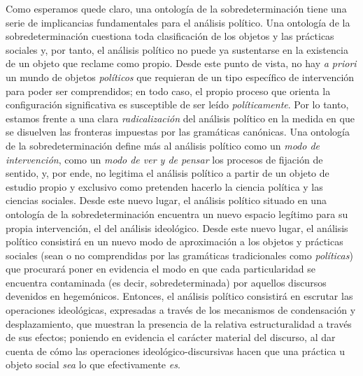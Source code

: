 Como esperamos quede claro, una ontología de la sobredeterminación tiene una serie de implicancias fundamentales para el análisis político. Una ontología de la sobredeterminación cuestiona toda clasificación de los objetos y las prácticas sociales y, por tanto, el análisis político no puede ya sustentarse en la existencia de un objeto que reclame como propio. Desde este punto de vista, no hay \emph{a priori} un mundo de objetos \emph{políticos} que requieran de un tipo específico de intervención para poder ser comprendidos; en todo caso, el propio proceso que orienta la configuración significativa es susceptible de ser leído \emph{políticamente}. Por lo tanto, estamos frente a una clara \emph{radicalización} del análisis político en la medida en que se disuelven las fronteras impuestas por las gramáticas canónicas. Una ontología de la sobredeterminación define más al análisis político como un \emph{modo de intervención}, como un \emph{modo de ver y de pensar} los procesos de fijación de sentido, y, por ende, no legitima el análisis político a partir de un objeto de estudio propio y exclusivo como pretenden hacerlo la ciencia política y las ciencias sociales. Desde este nuevo lugar, el análisis político situado en una ontología de la sobredeterminación encuentra un nuevo espacio legítimo para su propia intervención, el del análisis ideológico. Desde este nuevo lugar, el análisis político consistirá en un nuevo modo de aproximación a los objetos y prácticas sociales (sean o no comprendidas por las gramáticas tradicionales como \emph{políticas}) que procurará poner en evidencia el modo en que cada particularidad se encuentra contaminada (es decir, sobredeterminada) por aquellos discursos devenidos en hegemónicos. Entonces, el análisis político consistirá en escrutar las operaciones ideológicas, expresadas a través de los mecanismos de condensación y desplazamiento, que muestran la presencia de la relativa estructuralidad a través de sus efectos; poniendo en evidencia el carácter material del discurso, al dar cuenta de cómo las operaciones ideológico-discursivas hacen que una práctica u objeto social \emph{sea} lo que efectivamente \emph{es}.

